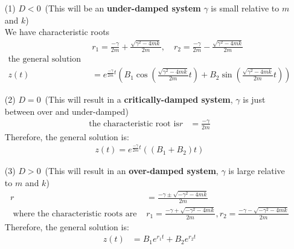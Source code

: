 \documentclass[12pt,a4paper]{article}
\begin{document}
		\begin{enumerate}
			\item[(1)] $D < 0$\ (This will be an \textbf{under-damped system}  $\gamma$  is small relative to $m $and $ k$)\\
					   We have
characteristic roots
					\begin{align*}
							& r_1 =  \frac{ - \gamma }{ 2m}  + \frac{  \sqrt{  \gamma^2  -4mk }}{  2m}  , \quad r_2  = \frac{ - \gamma }{ 2m}  -  \frac{  \sqrt{  \gamma^2  -4mk }}{  2m} \\
							\text{the general solution therefore is } \\
							z(t) &=  e^{\frac{ -\gamma}{ 2m } t} \left(   B_1 \cos \left( \frac{ \sqrt{ \gamma^2 -4mk }} {  2m}  t  \right)  + B_2 \sin \left(   \frac{ \sqrt{ \gamma^2 -4mk } } {  2m}   t \right)     \right) 
					\end{align*}
			 \item[(2)] $D =  0$\ (This will result in a \textbf{critically-damped system},  $\gamma$ is just between over and under-damped)\\
	
			 		\begin{align*}
			 				\text{the characteristic root is}  r &=  \frac{-\gamma}{  2m}
			 		\end{align*}
			 	Therefore, the general solution is:
			 	\begin{align*}
			 			z(t) =  e^{  \frac{-\gamma}{  2m} t } \left( \left(B_1  + B_2\right)t 	\right)	
				\end{align*}
			 \item[(3)] $D > 0$\ (This will result in an \textbf{over-damped system},  $\gamma$ is large relative to $m$ and $ k$)
			 	\begin{align*}
			 		r  &= \frac{  -\gamma \pm \sqrt{  -\gamma^2  -4mk  }  }{  2m}\\
			 		\text{ where the characteristic roots are } &  r_1  = \frac{  -\gamma +  \sqrt{  -\gamma^2  -4mk  }  }{  2m} , r_2 = \frac{  -\gamma  -  \sqrt{  -\gamma^2  -4mk  }  }{  2m}
			 	\end{align*}
			 Therefore, the general solution is: 
			 		\begin{align*}
			 				z(t) &=  B_1 e^{r_1 t}  + B_2 e^{r_2 t}
			 		\end{align*}
		\end{enumerate}
		\

			
\end{document}
